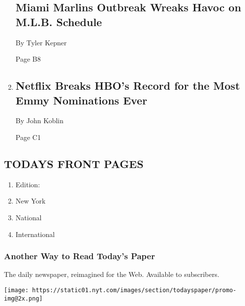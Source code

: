 \begin{enumerate}
  \hypertarget{miami-marlins-outbreak-wreaks-havoc-on-mlb-schedule}{%
  \subsection{Miami Marlins Outbreak Wreaks Havoc on M.L.B.
  Schedule}\label{miami-marlins-outbreak-wreaks-havoc-on-mlb-schedule}}

  By Tyler Kepner

  Page B8
\item
  \href{/2020/07/28/arts/television/emmy-nominations.html}{}

  \hypertarget{netflix-breaks-hbos-record-for-the-most-emmy-nominations-ever}{%
  \subsection{Netflix Breaks HBO's Record for the Most Emmy Nominations
  Ever}\label{netflix-breaks-hbos-record-for-the-most-emmy-nominations-ever}}

  By John Koblin

  Page C1
\end{enumerate}

\hypertarget{todays-front-pages}{%
\subsection{TODAYS FRONT PAGES}\label{todays-front-pages}}

\begin{enumerate}
\def\labelenumi{\arabic{enumi}.}
\tightlist
\item
  Edition:
\item
  New York
\item
  National
\item
  International
\end{enumerate}

\href{http://app.nytimes.com/todayspaper}{}

\hypertarget{another-way-to-read-todays-paper}{%
\subsubsection{Another Way to Read Today's
Paper}\label{another-way-to-read-todays-paper}}

The daily newspaper, reimagined for the Web. Available to subscribers.

\texttt{[image: https://static01.nyt.com/images/section/todayspaper/promo-img@2x.png]}

